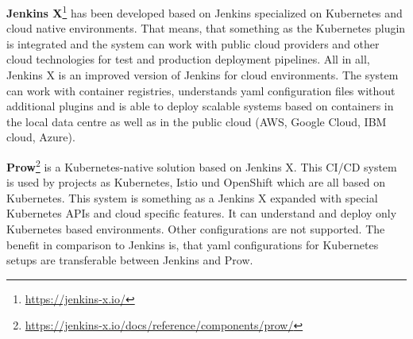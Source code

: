 \textbf{Jenkins X}\footnote{\url{https://jenkins-x.io/}} has been developed based on Jenkins specialized on Kubernetes and cloud native environments. That means, that something as the Kubernetes plugin is integrated and the system can work with public cloud providers and other cloud technologies for test and production deployment pipelines. All in all, Jenkins X is an improved version of Jenkins for cloud environments. The system can work with container registries, understands yaml configuration files without additional plugins and is able to deploy scalable systems based on containers in the local data centre as well as in the public cloud (AWS, Google Cloud, IBM cloud, Azure).

\textbf{Prow}\footnote{\url{https://jenkins-x.io/docs/reference/components/prow/}} is a Kubernetes-native solution based on Jenkins X. This CI/CD system is used by projects as Kubernetes, Istio und OpenShift which are all based on Kubernetes. This system is something as a Jenkins X expanded with special Kubernetes APIs and cloud specific features. It can understand and deploy only Kubernetes based environments. Other configurations are not supported. The benefit in comparison to Jenkins is, that yaml configurations for Kubernetes setups are transferable between Jenkins and Prow.